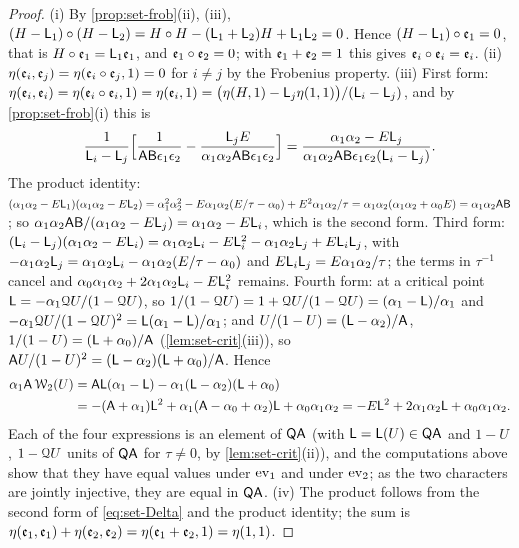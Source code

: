 \begin{proof}
(i) By \cref{prop:set-frob}(ii), (iii), $(H-\mathsf{L}_1)\circ(H-\mathsf{L}_2)=H\circ H-(\mathsf{L}_1+\mathsf{L}_2)H+\mathsf{L}_1\mathsf{L}_2=0$. Hence $(H-\mathsf{L}_1)\circ\mathfrak{e}_1=0$, that is $H\circ\mathfrak{e}_1=\mathsf{L}_1\mathfrak{e}_1$, and $\mathfrak{e}_1\circ\mathfrak{e}_2=0$; with $\mathfrak{e}_1+\mathfrak{e}_2=1$ this gives $\mathfrak{e}_i\circ\mathfrak{e}_i=\mathfrak{e}_i$. (ii) $\eta(\mathfrak{e}_i,\mathfrak{e}_j)=\eta(\mathfrak{e}_i\circ\mathfrak{e}_j,1)=0$ for $i\neq j$ by the Frobenius property.
(iii) First form: $\eta(\mathfrak{e}_i,\mathfrak{e}_i)=\eta(\mathfrak{e}_i\circ\mathfrak{e}_i,1)=\eta(\mathfrak{e}_i,1)=\big(\eta(H,1)-\mathsf{L}_j\eta(1,1)\big)/(\mathsf{L}_i-\mathsf{L}_j)$, and by \cref{prop:set-frob}(i) this is
\[
\frac{1}{\mathsf{L}_i-\mathsf{L}_j}\Big[\frac{1}{\mathsf{A}\mathsf{B}\epsilon_1\epsilon_2}-\frac{\mathsf{L}_jE}{\alpha_1\alpha_2\mathsf{A}\mathsf{B}\epsilon_1\epsilon_2}\Big]=\frac{\alpha_1\alpha_2-E\mathsf{L}_j}{\alpha_1\alpha_2\mathsf{A}\mathsf{B}\epsilon_1\epsilon_2(\mathsf{L}_i-\mathsf{L}_j)}.
\]
The product identity: $(\alpha_1\alpha_2-E\mathsf{L}_1)(\alpha_1\alpha_2-E\mathsf{L}_2)=\alpha_1^2\alpha_2^2-E\alpha_1\alpha_2(E/\tau-\alpha_0)+E^2\alpha_1\alpha_2/\tau=\alpha_1\alpha_2(\alpha_1\alpha_2+\alpha_0E)=\alpha_1\alpha_2\mathsf{A}\mathsf{B}$; so $\alpha_1\alpha_2\mathsf{A}\mathsf{B}/(\alpha_1\alpha_2-E\mathsf{L}_j)=\alpha_1\alpha_2-E\mathsf{L}_i$, which is the second form. Third form: $(\mathsf{L}_i-\mathsf{L}_j)(\alpha_1\alpha_2-E\mathsf{L}_i)=\alpha_1\alpha_2\mathsf{L}_i-E\mathsf{L}_i^2-\alpha_1\alpha_2\mathsf{L}_j+E\mathsf{L}_i\mathsf{L}_j$, with $-\alpha_1\alpha_2\mathsf{L}_j=\alpha_1\alpha_2\mathsf{L}_i-\alpha_1\alpha_2(E/\tau-\alpha_0)$ and $E\mathsf{L}_i\mathsf{L}_j=E\alpha_1\alpha_2/\tau$; the terms in $\tau^{-1}$ cancel and $\alpha_0\alpha_1\alpha_2+2\alpha_1\alpha_2\mathsf{L}_i-E\mathsf{L}_i^2$ remains. Fourth form: at a critical point $\mathsf{L}=-\alpha_1\mathcal{Q} U/(1-\mathcal{Q} U)$, so $1/(1-\mathcal{Q} U)=1+\mathcal{Q} U/(1-\mathcal{Q} U)=(\alpha_1-\mathsf{L})/\alpha_1$ and $-\alpha_1\mathcal{Q} U/(1-\mathcal{Q} U)^2=\mathsf{L}(\alpha_1-\mathsf{L})/\alpha_1$; and $U/(1-U)=(\mathsf{L}-\alpha_2)/\mathsf{A}$, $1/(1-U)=(\mathsf{L}+\alpha_0)/\mathsf{A}$ (\cref{lem:set-crit}(iii)), so $\mathsf{A} U/(1-U)^2=(\mathsf{L}-\alpha_2)(\mathsf{L}+\alpha_0)/\mathsf{A}$. Hence
\begin{align*}
\alpha_1\mathsf{A}\,\mathcal{W}_2(U)&=\mathsf{A}\mathsf{L}(\alpha_1-\mathsf{L})-\alpha_1(\mathsf{L}-\alpha_2)(\mathsf{L}+\alpha_0)\\
&=-(\mathsf{A}+\alpha_1)\mathsf{L}^2+\alpha_1(\mathsf{A}-\alpha_0+\alpha_2)\mathsf{L}+\alpha_0\alpha_1\alpha_2=-E\mathsf{L}^2+2\alpha_1\alpha_2\mathsf{L}+\alpha_0\alpha_1\alpha_2 .
\end{align*}
Each of the four expressions is an element of $\mathsf{QA}$ (with $\mathsf{L}=\mathsf{L}(U)\in\mathsf{QA}$ and $1-U$, $1-\mathcal{Q} U$ units of $\mathsf{QA}$ for $\tau\neq0$, by \cref{lem:set-crit}(ii)), and the computations above show that they have equal values under $\operatorname{ev}_1$ and under $\operatorname{ev}_2$; as the two characters are jointly injective, they are equal in $\mathsf{QA}$.
(iv) The product follows from the second form of \eqref{eq:set-Delta} and the product identity; the sum is $\eta(\mathfrak{e}_1,\mathfrak{e}_1)+\eta(\mathfrak{e}_2,\mathfrak{e}_2)=\eta(\mathfrak{e}_1+\mathfrak{e}_2,1)=\eta(1,1)$.
\end{proof}

